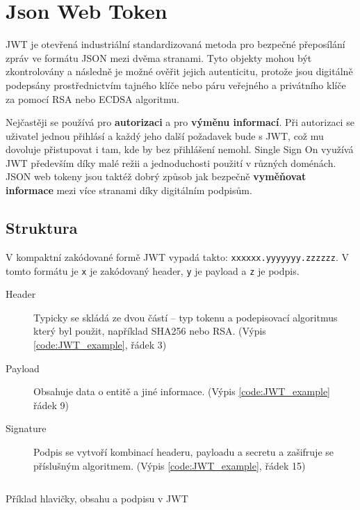\section{Json Web Token}\label{sec:jwt} %
JWT je otevřená industriální standardizovaná %
metoda pro bezpečné přeposílání zpráv ve formátu JSON mezi dvěma stranami. Tyto objekty mohou být zkontrolovány a následně je možné ověřit jejich autenticitu, protože jsou digitálně podepsány prostřednictvím tajného klíče nebo páru veřejného a privátního klíče za pomocí RSA nebo ECDSA algoritmu.

Nejčastěji se používá pro \textbf{autorizaci} a pro \textbf{výměnu informací}. Při autorizaci se uživatel jednou přihlásí a každý jeho další požadavek bude s JWT, což mu dovoluje přistupovat i tam, kde by bez přihlášení nemohl. Single Sign On %
využívá JWT především díky malé režii a jednoduchosti použití v různých doménách. JSON web tokeny jsou taktéž dobrý způsob jak bezpečně \textbf{vyměňovat informace} mezi více stranami díky digitálním podpisům.

\subsection{Struktura}
V kompaktní zakódované formě JWT vypadá takto: \texttt{xxxxxx.yyyyyyy.zzzzzz}. V tomto formátu je \texttt{x} je zakódovaný header, \texttt{y} je payload a \texttt{z} je podpis.

\begin{description}
    \item[Header] Typicky se skládá ze dvou částí -- typ tokenu a podepisovací algoritmus který byl použit, například SHA256 nebo RSA. (Výpis \ref{code:JWT_example}, řádek 3)
    \item[Payload] Obsahuje data o entitě a jiné informace. (Výpis \ref{code:JWT_example} řádek 9)
    \item[Signature] Podpis se vytvoří kombinací headeru, payloadu a secretu a zašifruje se příslušným algoritmem. (Výpis \ref{code:JWT_example}, řádek 15)
\end{description}

\begin{listing}[ht!]
    \inputminted[]{json}{resources/code/security/JWT.jsonc}
    \caption{Příklad hlavičky, obsahu a podpisu v JWT} %
    \label{code:JWT_example}
\end{listing}


